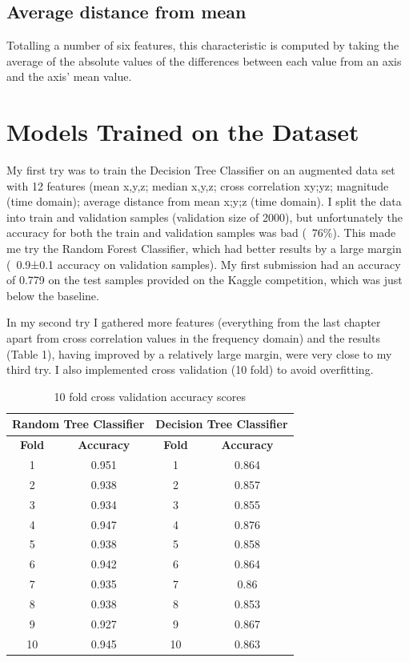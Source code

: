 \documentclass{article}
\begin{document}
\subsection{Average distance from mean}
Totalling a number of six features, this characteristic is computed by taking the average of the absolute values of the differences between each value from an axis and the axis' mean value. 

\section{Models Trained on the Dataset}
My first try was to train the Decision Tree Classifier on an augmented data set with 12 features (mean x,y,z; median x,y,z; cross correlation xy;yz; magnitude (time domain); average distance from mean x;y;z (time domain). I split the data into train and validation samples (validation size of 2000), but unfortunately the accuracy for both the train and validation samples was bad (~76\%). This made me try the Random Forest Classifier, which had better results by a large margin (~0.9±0.1 accuracy on validation samples). My first submission had an accuracy of 0.779 on the test samples provided on the Kaggle competition, which was just below the baseline.

In my second try I gathered more features (everything from the last chapter apart from cross correlation values in the frequency domain) and the results (Table 1), having improved by a relatively large margin, were very close to my third try. I also implemented cross validation (10 fold) to avoid overfitting.

\begin{table}[h]
	\centering
	\caption{10 fold cross validation accuracy scores}
	\label{table1}
	\begin{tabular}{cccc}
		\bottomrule
		\multicolumn{2}{|c|}{\textbf{Random Tree Classifier}} &
		\multicolumn{2}{c|}{\textbf{Decision Tree Classifier}} \\
		\toprule
		\textbf{Fold}& \textbf{Accuracy}& \textbf{Fold}& \textbf{Accuracy} \\
		\midrule
		1 & 0.951 & 1 & 0.864 \\
		2 & 0.938 & 2 & 0.857 \\
		3 & 0.934 & 3 & 0.855 \\
		4 & 0.947 & 4 & 0.876 \\
		5 & 0.938 & 5 & 0.858 \\
		6 & 0.942 & 6 & 0.864 \\
		7 & 0.935 & 7 & 0.86 \\
		8 & 0.938 & 8 & 0.853 \\
		9 & 0.927 & 9 & 0.867 \\
		10 & 0.945 & 10 & 0.863 \\
 		\bottomrule
	\end{tabular}
\end{table}
\end{document}
